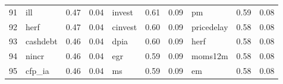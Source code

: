 \documentclass[12pt]{article}
\begin{document}
\begin{landscape}
\begin{footnotesize}
\begin{longtable}{l|lcc|lcc|lcc}
			91                    & ill                         & 0.47                                                                                 & 0.04                            & invest                      & 0.61                                                                                 & 0.09                            & pm                          & 0.59                                                                                 & 0.08                           \\
			92                    & herf                        & 0.47                                                                                 & 0.04                            & cinvest                     & 0.60                                                                                 & 0.09                            & pricedelay                  & 0.58                                                                                 & 0.08                           \\
			93                    & cashdebt                    & 0.46                                                                                 & 0.04                            & dpia                        & 0.60                                                                                 & 0.09                            & herf                        & 0.58                                                                                 & 0.08                           \\
			94                    & nincr                       & 0.46                                                                                 & 0.04                            & egr                         & 0.59                                                                                 & 0.09                            & moms12m                     & 0.58                                                                                 & 0.08                           \\
			95                    & cfp\_ia                     & 0.46                                                                                 & 0.04                            & ms                          & 0.59                                                                                 & 0.09                            & em                          & 0.58                                                                                 & 0.08                           \\

\end{longtable}
\end{footnotesize}
\end{landscape}
\end{document}

